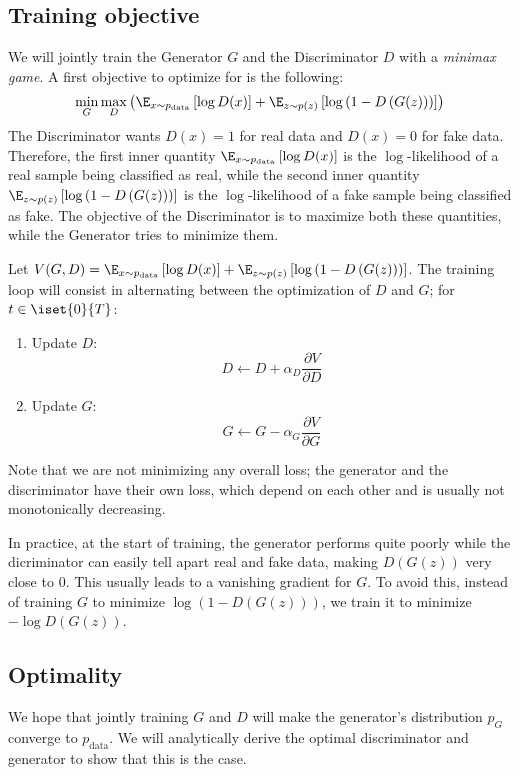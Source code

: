 \subsection{Training objective}
We will jointly train the Generator $G$ and the Discriminator $D$ with a \emph{minimax game}. A first objective to optimize for is the following:
\begin{equation}
    \min_G\max_D \left(
        \E_{x\sim p_{\text{data}}}\left[\log D(x)\right] + \E_{z\sim p(z)}\left[\log\left(1-D\left(G(z)\right)\right)\right]
    \right)
\end{equation}
The Discriminator wants $D(x)=1$ for real data and $D(x)=0$ for fake data. Therefore, the first inner quantity $\E_{x\sim p_{\text{data}}}\left[\log D(x)\right]$ is the $\log$-likelihood of a real sample being classified as real, while the second inner quantity $\E_{z\sim p(z)}\left[\log\left(1-D\left(G(z)\right)\right)\right]$ is the $\log$-likelihood of a fake sample being classified as fake. The objective of the Discriminator is to maximize both these quantities, while the Generator tries to minimize them.

Let $V(G, D) = \E_{x\sim p_{\text{data}}}\left[\log D(x)\right] + \E_{z\sim p(z)}\left[\log\left(1-D\left(G(z)\right)\right)\right]$. The training loop will consist in alternating between the optimization of $D$ and $G$; for $t\in\iset{0}{T}$:
\begin{enumerate}
    \item Update $D$: \begin{equation*}D\longleftarrow D+\alpha_D\frac{\partial V}{\partial D}\end{equation*}
    \item Update $G$: \begin{equation*}G\longleftarrow G-\alpha_G\frac{\partial V}{\partial G}\end{equation*}
\end{enumerate}
Note that we are not minimizing any overall loss; the generator and the discriminator have their own loss, which depend on each other and is usually not monotonically decreasing.

In practice, at the start of training, the generator performs quite poorly while the dicriminator can easily tell apart real and fake data, making $D(G(z))$ very close to $0$. This usually leads to a vanishing gradient for $G$. To avoid this, instead of training $G$ to minimize $\log\left(1-D(G(z))\right)$, we train it to minimize $-\log D(G(z))$.

\subsection{Optimality}
We hope that jointly training $G$ and $D$ will make the generator's distribution $p_G$ converge to $p_{\text{data}}$. We will analytically derive the optimal discriminator and generator to show that this is the case.

